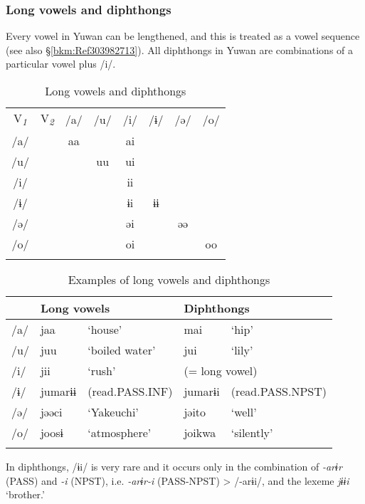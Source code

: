 \subsubsection{Long vowels and diphthongs}
\label{bkm:Ref367392475}\hypertarget{RefHeadingToc395696965}{}\label{bkm:Ref347178348}
Every vowel in Yuwan can be lengthened, and this is treated as a vowel sequence (see also §\ref{bkm:Ref303982713}). All diphthongs in Yuwan are combinations of a particular vowel plus /i/.

\begin{table}
\caption{Long vowels and diphthongs}
\begin{tabular}{ *{8}{c} }
\lsptoprule
 V\textit{\textsubscript{1}} & V\textit{\textsubscript{2}} & /a/ & /u/ &  /i/ & /ɨ/ & /ə/ & /o/\\
 /a/  &   & aa & & ai      \\
 /u/  &   & & uu & ui      \\
 /i/  &   & & & ii         \\
 /ɨ/  &   & & & ɨi & ɨɨ    \\
 /ə/  &   & & & əi & & əə  \\
 /o/  &   & & & oi & & & oo\\
\lspbottomrule
\end{tabular}
\end{table}


\begin{table}
\caption{Examples of long vowels and diphthongs}
\begin{tabular}{ *{5}{l} }
\lsptoprule
 & \multicolumn{2}{l}{Long vowels}  & \multicolumn{2}{l}{Diphthongs}\\\midrule
{/a/} & {jaa} & {‘house’}  & {mai}  & {‘hip’}\\
{/u/} & {juu} & {‘boiled water’} & {jui} & {‘lily’}\\
{/i/} & {jii} & {‘rush’} & \multicolumn{2}{l}{(= long vowel)}\\
{/ɨ/} & {jumarɨɨ}  & {(read.PASS.INF)} & jumarɨi & {(read.PASS.NPST)}\\
{/ə/} & {jəəci} & {‘Yakeuchi’} & {jəito} &   {‘well’}\\
{/o/} & {joosɨ} & {‘atmosphere’}  & {joikwa} &  {‘silently’}\\
\lspbottomrule
\end{tabular}
\end{table}


In diphthongs, /ɨi/ is very rare and it occurs only in the combination of \textit{-arɨr} (PASS) and \textit{-i} (NPST), i.e. \textit{-arɨr-i} (PASS-NPST) > /-arɨi/, and the lexeme \textit{jɨɨi} ‘brother.’

